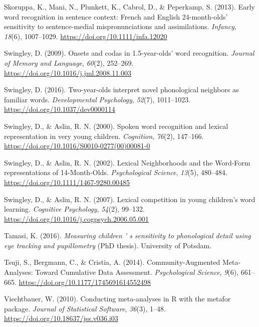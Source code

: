 \documentclass[
  english,
  man, noextraspace]{apa6}
\newlength{\cslhangindent}
\newenvironment{cslreferences}%
  {\setlength{\parindent}{0pt}%
  \everypar{\setlength{\hangindent}{\cslhangindent}}\ignorespaces}%
  {\par}
\begin{document}
\begin{cslreferences}
\leavevmode\hypertarget{ref-Skoruppa2013}{}%
Skoruppa, K., Mani, N., Plunkett, K., Cabrol, D., \& Peperkamp, S. (2013). Early word recognition in sentence context: French and English 24-month-olds' sensitivity to sentence-medial mispronunciations and assimilations. \emph{Infancy}, \emph{18}(6), 1007--1029. \url{https://doi.org/10.1111/infa.12020}

\leavevmode\hypertarget{ref-Swingley2009}{}%
Swingley, D. (2009). Onsets and codas in 1.5-year-olds' word recognition. \emph{Journal of Memory and Language}, \emph{60}(2), 252--269. \url{https://doi.org/10.1016/j.jml.2008.11.003}

\leavevmode\hypertarget{ref-Swingley2016}{}%
Swingley, D. (2016). Two-year-olds interpret novel phonological neighbors as familiar words. \emph{Developmental Psychology}, \emph{52}(7), 1011--1023. \url{https://doi.org/10.1037/dev0000114}

\leavevmode\hypertarget{ref-Swingley2000}{}%
Swingley, D., \& Aslin, R. N. (2000). Spoken word recognition and lexical representation in very young children. \emph{Cognition}, \emph{76}(2), 147--166. \url{https://doi.org/10.1016/S0010-0277(00)00081-0}

\leavevmode\hypertarget{ref-Swingley2002}{}%
Swingley, D., \& Aslin, R. N. (2002). Lexical Neighborhoods and the Word-Form representations of 14-Month-Olds. \emph{Psychological Science}, \emph{13}(5), 480--484. \url{https://doi.org/10.1111/1467-9280.00485}

\leavevmode\hypertarget{ref-Swingley2007}{}%
Swingley, D., \& Aslin, R. N. (2007). Lexical competition in young children's word learning. \emph{Cognitive Psychology}, \emph{54}(2), 99--132. \url{https://doi.org/10.1016/j.cogpsych.2006.05.001}

\leavevmode\hypertarget{ref-Tamasi2016}{}%
Tamasi, K. (2016). \emph{Measuring children ' s sensitivity to phonological detail using eye tracking and pupillometry} (PhD thesis). University of Potsdam.

\leavevmode\hypertarget{ref-Tsuji2014}{}%
Tsuji, S., Bergmann, C., \& Cristia, A. (2014). Community-Augmented Meta-Analyses: Toward Cumulative Data Assessment. \emph{Psychological Science}, \emph{9}(6), 661--665. \url{https://doi.org/10.1177/1745691614552498}

\leavevmode\hypertarget{ref-metafor}{}%
Viechtbauer, W. (2010). Conducting meta-analyses in R with the metafor package. \emph{Journal of Statistical Software}, \emph{36}(3), 1--48. \url{https://doi.org/10.18637/jss.v036.i03}


\end{cslreferences}
\end{document}
